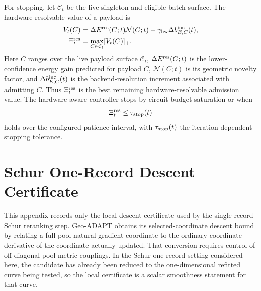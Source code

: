 \documentclass[
  reprint,
  amsmath,
  amssymb,
  aps,
  pra,
  nofootinbib,
  superscriptaddress,
  floatfix
]{revtex4-2}
\begin{document}
For stopping, let $\mathcal C_t$ be the live singleton and eligible batch surface.  The hardware-resolvable value of a payload is
\begin{equation}
\begin{aligned}
V_t(C)&=
\Delta E^{\rm res}(C;t)\mathcal N(C;t)
-\gamma_{\rm hw}\Delta b_{E,C}^{\rm inc}(t),
\\
\Xi_t^{\rm res}&=\max_{C\in\mathcal C_t}[V_t(C)]_+ .
\end{aligned}
\label{eq:appendix_stopping_residual}
\end{equation}
Here \(C\) ranges over the live payload surface \(\mathcal C_t\), \(\Delta E^{\rm res}(C;t)\) is the lower-confidence energy gain predicted for payload \(C\), \(\mathcal N(C;t)\) is its geometric novelty factor, and \(\Delta b_{E,C}^{\rm inc}(t)\) is the backend-resolution increment associated with admitting \(C\). Thus \(\Xi_t^{\rm res}\) is the best remaining hardware-resolvable admission value.
The hardware-aware controller stops by circuit-budget saturation or when
\begin{equation}
\Xi_t^{\rm res}\le\tau_{\rm stop}(t)
\label{eq:appendix_stop_rule}
\end{equation}
holds over the configured patience interval, with \(\tau_{\rm stop}(t)\) the iteration-dependent stopping tolerance.

\section{Schur One-Record Descent Certificate}
\label{app:schur_one_record_descent}
\label{app:schur_convergence}

This appendix records only the local descent certificate used by the
single-record Schur reranking step. Geo-ADAPT \cite{Sohail2026GeoADAPT}
obtains its selected-coordinate descent bound by relating a full-pool
natural-gradient coordinate to the ordinary coordinate derivative of the
coordinate actually updated. That conversion requires control of
off-diagonal pool-metric couplings. In the Schur one-record setting
considered here, the candidate has already been reduced to the
one-dimensional refitted curve being tested, so the local certificate is
a scalar smoothness statement for that curve.
\end{document}
